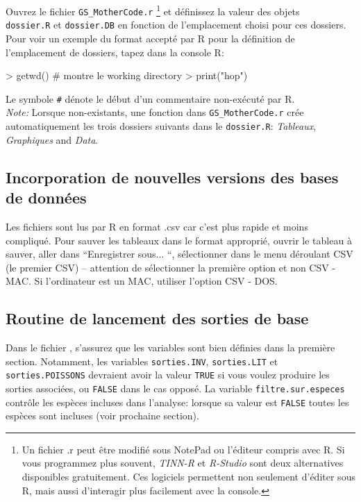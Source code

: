 \documentclass{article}
\begin{document}
Ouvrez le fichier \texttt{GS\_MotherCode.r} \footnote{Un fichier .r
  peut être modifié sous NotePad ou l'éditeur
compris avec R. Si vous programmez plus souvent, \emph{TINN-R} et \emph{R-Studio}
sont deux alternatives disponibles gratuitement. Ces logiciels
permettent non seulement
d'éditer sous R, mais aussi d'interagir plus facilement avec la
console. } et définissez la valeur des objets \\ \texttt{dossier.R} et \texttt{dossier.DB}
en fonction de l'emplacement choisi pour ces dossiers.
Pour voir un exemple du format accepté par R pour la
  définition de l'emplacement de dossiers, tapez dans la console R:
\begin{Schunk}
\begin{Sinput}
> getwd() # montre le working directory
> print("hop")
\end{Sinput}
\end{Schunk}
  \noindent Le symbole \texttt{\#} dénote le début d'un commentaire non-exécuté
par R.\\


\noindent \emph{Note:} Lorsque non-existants, une fonction dans \texttt{GS\_MotherCode.r} crée
automatiquement les trois dossiers
suivants dans le \texttt{dossier.R}: \emph{Tableaux},
\emph{Graphiques} and \emph{Data}. \\


\subsection*{Incorporation de nouvelles versions des bases de données}
\label{nouvdb}
Les fichiers sont lus par R en format .csv car c'est plus rapide et
moins compliqué. Pour sauver les tableaux dans le format approprié,
ouvrir le tableau à sauver, aller dans ``Enregistrer sous... ``,
sélectionner dans le menu déroulant CSV (le premier CSV) -- attention
de sélectionner la première option et non CSV - MAC. Si l'ordinateur
est un MAC, utiliser l'option CSV - DOS.

   \subsection*{Routine de lancement des sorties de base}

   Dans le fichier \mcode, s'assurez que les variables sont bien définies dans
   la première section. Notamment, les variables
   \texttt{sorties.INV}, \texttt{sorties.LIT} et
   \texttt{sorties.POISSONS} devraient avoir la valeur \texttt{TRUE} si vous
   voulez produire les sorties associées, ou \texttt{FALSE} dans le
   cas opposé. La variable \texttt{filtre.sur.especes} contrôle les
   espèces incluses dans l'analyse: lorsque sa valeur est
   \texttt{FALSE} toutes les espèces sont incluses (voir prochaine
   section).
\end{document}
